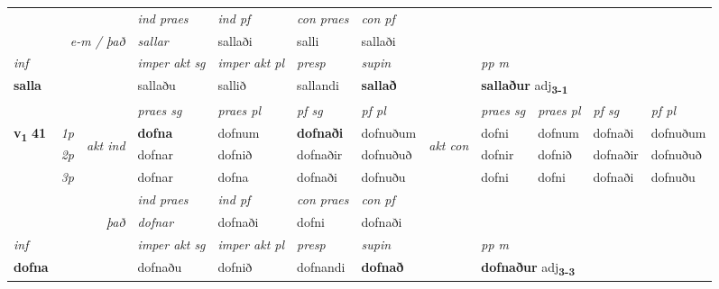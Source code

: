 \begin{longtable}[l]{X>{\footnotesize\itshape}llXXXXlXXXX}
   && &  \textit{ind praes} & \textit{ind pf} & \textit{con praes} & \textit{con pf} \\*
\multicolumn{3}{r}{\textit{e-m / það}} & sallar & sallaði & salli & sallaði \\*

\cmidrule{4-7}
   {\textit{inf}} & &  & \textit{imper akt sg} & \textit{imper akt pl}   & \textit{presp} & \textit{supin}  && \textit{pp m} \\*
  {\textbf{salla}} & && sallaðu  & sallið   & sallandi &  \textbf{sallað}  && \multicolumn{2}{l}{\textbf{sallaður} adj\textbf{\textsubscript{3-1}}} \\*

\midrule

 & &   & \textit{praes sg}  & \textit{praes pl}    & \textit{ pf sg} & \textit{pf pl} & & \textit{praes sg}  & \textit{praes pl}    & \textit{pf sg} & \textit{pf pl }  \\ \cmidrule{4-7} \cmidrule{9-12}
 \multirow{2}{*}{{{\textbf{v{\textsubscript{1}}} \Large{\textbf{41}}}}}  & 1p & \multirow{3}{*}{\begin{turn}{90}\textit{akt ind}\end{turn}} & \textbf{dofna} & dofnum & \textbf{dofnaði} & dofnuðum & \multirow{3}{*}{\begin{turn}{90}\textit{akt con}\end{turn}} &dofni & dofnum & dofnaði & dofnuðum\\*
 & 2p &  &  dofnar  & dofnið & dofnaðir & dofnuðuð & & dofnir & dofnið & dofnaðir & dofnuðuð \\*
 & 3p &  & dofnar & dofna & dofnaði & dofnuðu & & dofni & dofni& dofnaði & dofnuðu \\*
\cmidrule{4-7} \cmidrule{9-12}

   && &  \textit{ind praes} & \textit{ind pf} & \textit{con praes} & \textit{con pf} \\*
\multicolumn{3}{r}{\textit{það}} & dofnar & dofnaði & dofni & dofnaði \\*

\cmidrule{4-7}
   {\textit{inf}} & &  & \textit{imper akt sg} & \textit{imper akt pl}   & \textit{presp} & \textit{supin}  && \textit{pp m} \\*
  {\textbf{dofna}} & && dofnaðu  & dofnið   & dofnandi &  \textbf{dofnað}  && \multicolumn{2}{l}{\textbf{dofnaður} adj\textbf{\textsubscript{3-3}}} \\*

\midrule


\end{longtable}
